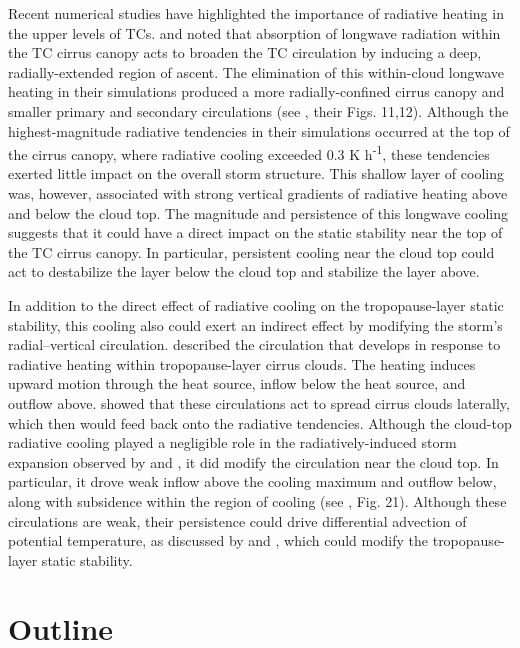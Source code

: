 Recent numerical studies have highlighted the importance of radiative heating in the upper levels of TCs.
\cite{Buetal2014} and \cite{Fovelletal2016} noted that absorption of longwave radiation within the TC cirrus canopy acts to broaden the TC circulation by inducing a deep, radially-extended region of ascent.
The elimination of this within-cloud longwave heating in their simulations produced a more radially-confined cirrus canopy and smaller primary and secondary circulations (see \citeauthor{Buetal2014} \citeyear{Buetal2014}, their Figs. 11,12).
Although the highest-magnitude radiative tendencies in their simulations occurred at the top of the cirrus canopy, where radiative cooling exceeded 0.3 K h\textsuperscript{-1}, these tendencies exerted little impact on the overall storm structure.
This shallow layer of cooling was, however, associated with strong vertical gradients of radiative heating above and below the cloud top.
The magnitude and persistence of this longwave cooling suggests that it could have a direct impact on the static stability near the top of the TC cirrus canopy.
In particular, persistent cooling near the cloud top could act to destabilize the layer below the cloud top and stabilize the layer above.

In addition to the direct effect of radiative cooling on the tropopause-layer static stability, this cooling also could exert an indirect effect by modifying the storm's radial--vertical circulation.
\cite{Durranetal2009} described the circulation that develops in response to radiative heating within tropopause-layer cirrus clouds.
The heating induces upward motion through the heat source, inflow below the heat source, and outflow above.
\cite{Dinhetal2010} showed that these circulations act to spread cirrus clouds laterally, which then would feed back onto the radiative tendencies.
Although the cloud-top radiative cooling played a negligible role in the radiatively-induced storm expansion observed by \cite{Buetal2014} and \cite{Fovelletal2016}, it did modify the circulation near the cloud top.
In particular, it drove weak inflow above the cooling maximum and outflow below, along with subsidence within the region of cooling (see \citeauthor{Fovelletal2016} \citeyear{Fovelletal2016}, Fig. 21).
Although these circulations are weak, their persistence could drive differential advection of potential temperature, as discussed by \cite{ChenZhang2013} and \cite{ChenGopalakrishnan2015},  which could modify the tropopause-layer static stability.

\section{Outline}

